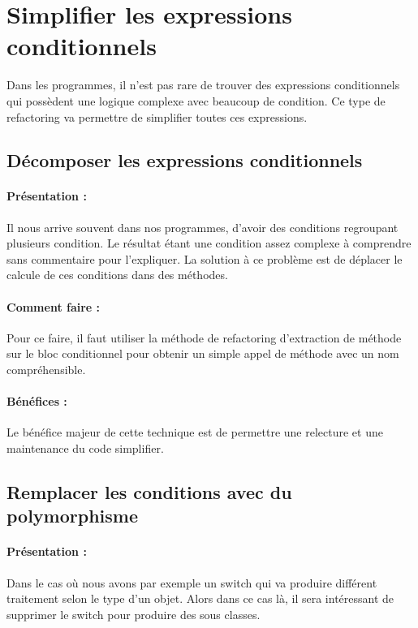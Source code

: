 \documentclass[a4paper,twoside,12pt,openright]{report}
\begin{document}
\newpage
\section{Simplifier les expressions conditionnels}
Dans les programmes, il n'est pas rare de trouver des expressions conditionnels qui possèdent une logique complexe avec beaucoup de condition. Ce type de refactoring va permettre de simplifier toutes ces expressions.\\



\subsection{Décomposer les expressions conditionnels}
\paragraph{Présentation :}
Il nous arrive souvent dans nos programmes, d'avoir des conditions regroupant plusieurs condition. Le résultat étant une condition assez complexe à comprendre sans commentaire pour l'expliquer. La solution à ce problème est de déplacer le calcule de ces conditions dans des méthodes.

\paragraph{Comment faire :}
Pour ce faire, il faut utiliser la méthode de refactoring d'extraction de méthode sur le bloc conditionnel pour obtenir un simple appel de méthode avec un nom compréhensible.

\paragraph{Bénéfices :}
Le bénéfice majeur de cette technique est de permettre une relecture et une maintenance du code simplifier.\\

\subsection{Remplacer les conditions avec du polymorphisme}
\paragraph{Présentation :}
Dans le cas où nous avons par exemple un switch qui va produire différent traitement selon le type d'un objet. Alors dans ce cas là, il sera intéressant de supprimer le switch pour produire des sous classes.
\end{document}
